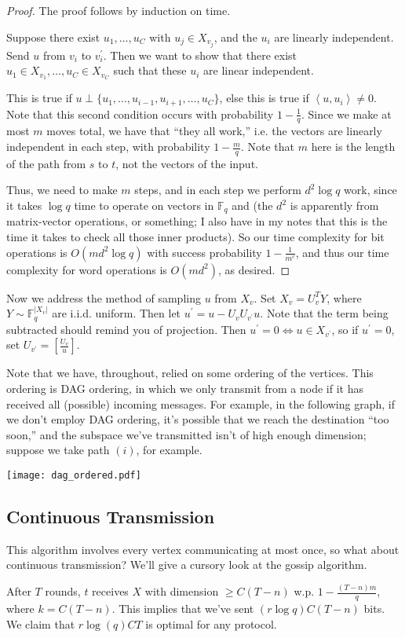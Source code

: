 \documentclass[11pt]{article}
\newcommand{\F}{\mathbb{F}}
\begin{document}
\begin{proof}
The proof follows by induction on time.

Suppose there exist $u_1, \dots, u_C$ with $u_j \in X_{v_j}$, and the $u_i$ are linearly independent. Send $u$ from $v_i$ to $v_i^\prime$. Then we want to show that there exist $u_1 \in X_{v_1}, \dots, u_C \in X_{v_C}$ such that these $u_i$ are linear independent.

This is true if $u \perp \{u_1, \ldots, u_{i-1}, u_{i+1}, \ldots, u_C \}$, else this is true if $\left< u, u_i \right> \neq 0$. Note that this second condition occurs with probability $1 - \frac{1}{q}$.  Since we make at most $m$ moves total, we have that ``they all work,'' i.e. the vectors are linearly independent in each step, with probability $1 - \frac{m}{q}$. Note that $m$ here is the length of the path from $s$ to $t$, not the vectors of the input.

Thus, we need to make $m$ steps, and in each step we perform $d^2\log q$ work, since it takes $\log q$ time to operate on vectors in $\F_q$ and (the $d^2$ is apparently from matrix-vector operations, or something; I also have in my notes that this is the time it takes to check all those inner products).  So our time complexity for bit operations is $O(md^2 \log q)$ with success probability $1 - \frac{1}{m^c}$, and thus our time complexity for word operations is $O(md^2)$, as desired.
\end{proof}

Now we address the method of sampling $u$ from $X_v$. Set $X_v = U_v^TY$, where $Y \sim \F_q^{|X_v|}$ are i.i.d. uniform. Then let $u^\prime = u - U_vU_{v^\prime}u$. Note that the term being subtracted should remind you of projection. Then $u^\prime = 0 \iff u \in X_{v^\prime}$, so if $u^\prime = 0$, set $U_{v^\prime} = \left[\frac{U_v}{u}\right]$.

Note that we have, throughout, relied on some ordering of the vertices. This ordering is DAG ordering, in which we only transmit from a node if it has received all (possible) incoming messages. For example, in the following graph, if we don't employ DAG ordering, it's possible that we reach the destination ``too soon,'' and the subspace we've transmitted isn't of high enough dimension; suppose we take path $(i)$, for example.

\begin{center}
\texttt{[image: dag\_ordered.pdf]}
\end{center}

\subsection{Continuous Transmission}

This algorithm involves every vertex communicating at most once, so what about continuous transmission?  We'll give a cursory look at the gossip algorithm.

After $T$ rounds, $t$ receives $X$ with dimension $\geq C(T-n)$ w.p. $1 - \frac{(T - n)m}{q}$, where $k = C(T-n)$. This implies that we've sent $(r\log q)C(T-n)$ bits. We claim that $r\log(q) CT$ is optimal for any protocol.
\end{document}
